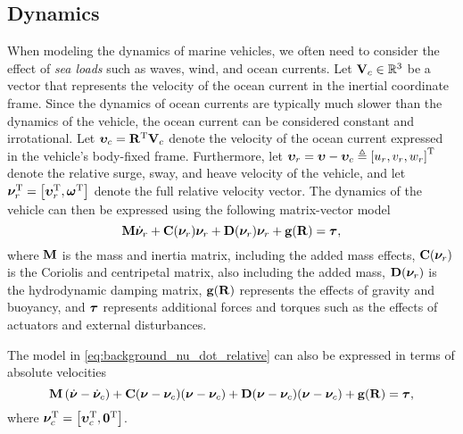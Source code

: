 \subsection{Dynamics}
\label{sec:background_model_dynamics}
When modeling the dynamics of marine vehicles, we often need to consider the effect of \emph{sea loads} such as waves, wind, and ocean currents.
Let $\mathbf{V}_c \in \mathbb{R}^3$ be a vector that represents the velocity of the ocean current in the inertial coordinate frame.
Since the dynamics of ocean currents are typically much slower than the dynamics of the vehicle, the ocean current can be considered constant and irrotational.
Let $\bm{\upsilon}_c = \mathbf{R}^{\mathrm{T}} \mathbf{V}_c$ denote the velocity of the ocean current expressed in the vehicle's body-fixed frame.
Furthermore, let $\bm{\upsilon}_r = \bm{\upsilon} - \bm{\upsilon}_c \triangleq \left[u_r, v_r, w_r\right]^{\mathrm{T}}$ denote the relative surge, sway, and heave velocity of the vehicle, and let $\bm{\nu}_r^{\mathrm{T}} = \left[\bm{\upsilon}_r^{\mathrm{T}}, \bm{\omega}^{\mathrm{T}}\right]$ denote the full relative velocity vector.
The dynamics of the vehicle can then be expressed using the following matrix-vector model \cite{fossen_handbook_2011}
\begin{equation}
    \mathbf{M} \dot{\bm{\nu}}_r + \mathbf{C}(\bm{\nu}_r)\bm{\nu}_r + \mathbf{D}(\bm{\nu}_r)\bm{\nu}_r + \mathbf{g}(\mathbf{R}) = \bm{\tau},
    \label{eq:background_nu_dot_relative}
\end{equation}
where $\mathbf{M}$ is the mass and inertia matrix, including the added mass effects, $\mathbf{C}(\bm{\nu}_r)$ is the Coriolis and centripetal matrix, also including the added mass, $\mathbf{D}(\bm{\nu}_r)$ is the hydrodynamic damping matrix, $\mathbf{g}(\mathbf{R})$ represents the effects of gravity and buoyancy, and $\bm{\tau}$ represents additional forces and torques such as the effects of actuators and external disturbances.

The model in \eqref{eq:background_nu_dot_relative} can also be expressed in terms of absolute velocities
\begin{equation}
    \mathbf{M} \left(\dot{\bm{\nu}} - \dot{\bm{\nu}}_c\right) + \mathbf{C}(\bm{\nu} - \bm{\nu}_c)(\bm{\nu} - \bm{\nu}_c) + \mathbf{D}(\bm{\nu} - \bm{\nu}_c)(\bm{\nu} - \bm{\nu}_c) + \mathbf{g}(\mathbf{R}) = \bm{\tau},
\end{equation}
where $\bm{\nu}_c^{\mathrm{T}} = \left[\bm{\upsilon}_c^{\mathrm{T}}, \mathbf{0}^{\mathrm{T}}\right]$.

